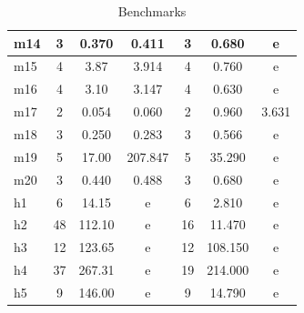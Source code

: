 \documentclass[headinclude, footinclude, abstract=on]{scrarticle}
\begin{document}
\begin{table}[H]
\begin{tabular}{l|ccc|ccc|}
\multicolumn{1}{|l|}{m14} & \multicolumn{1}{c|}{3}            & \multicolumn{1}{c|}{0.370}           & 0.411          & \multicolumn{1}{c|}{3}            & \multicolumn{1}{c|}{0.680}           & e              \\ \hline
\multicolumn{1}{|l|}{m15} & \multicolumn{1}{c|}{4}            & \multicolumn{1}{c|}{3.87}            & 3.914          & \multicolumn{1}{c|}{4}            & \multicolumn{1}{c|}{0.760}           & e              \\ \hline
\multicolumn{1}{|l|}{m16} & \multicolumn{1}{c|}{4}            & \multicolumn{1}{c|}{3.10}            & 3.147          & \multicolumn{1}{c|}{4}            & \multicolumn{1}{c|}{0.630}           & e              \\ \hline
\multicolumn{1}{|l|}{m17} & \multicolumn{1}{c|}{2}            & \multicolumn{1}{c|}{0.054}           & 0.060          & \multicolumn{1}{c|}{2}            & \multicolumn{1}{c|}{0.960}           & 3.631          \\ \hline
\multicolumn{1}{|l|}{m18} & \multicolumn{1}{c|}{3}            & \multicolumn{1}{c|}{0.250}           & 0.283          & \multicolumn{1}{c|}{3}            & \multicolumn{1}{c|}{0.566}           & e              \\ \hline
\multicolumn{1}{|l|}{m19} & \multicolumn{1}{c|}{5}            & \multicolumn{1}{c|}{17.00}           & 207.847        & \multicolumn{1}{c|}{5}            & \multicolumn{1}{c|}{35.290}          & e              \\ \hline
\multicolumn{1}{|l|}{m20} & \multicolumn{1}{c|}{3}            & \multicolumn{1}{c|}{0.440}           & 0.488          & \multicolumn{1}{c|}{3}            & \multicolumn{1}{c|}{0.680}           & e              \\ \hline
\multicolumn{1}{|l|}{h1}  & \multicolumn{1}{c|}{6}            & \multicolumn{1}{c|}{14.15}           & e              & \multicolumn{1}{c|}{6}            & \multicolumn{1}{c|}{2.810}           & e              \\ \hline
\multicolumn{1}{|l|}{h2}  & \multicolumn{1}{c|}{48}           & \multicolumn{1}{c|}{112.10}          & e              & \multicolumn{1}{c|}{16}           & \multicolumn{1}{c|}{11.470}          & e              \\ \hline
\multicolumn{1}{|l|}{h3}  & \multicolumn{1}{c|}{12}           & \multicolumn{1}{c|}{123.65}          & e              & \multicolumn{1}{c|}{12}           & \multicolumn{1}{c|}{108.150}         & e              \\ \hline
\multicolumn{1}{|l|}{h4}  & \multicolumn{1}{c|}{37}           & \multicolumn{1}{c|}{267.31}          & e              & \multicolumn{1}{c|}{19}           & \multicolumn{1}{c|}{214.000}         & e              \\ \hline
\multicolumn{1}{|l|}{h5}  & \multicolumn{1}{c|}{9}            & \multicolumn{1}{c|}{146.00}          & e              & \multicolumn{1}{c|}{9}            & \multicolumn{1}{c|}{14.790}          & e              \\ \hline
\end{tabular}
\caption{Benchmarks}
\label{table:perf}
\end{table}
\end{document}
